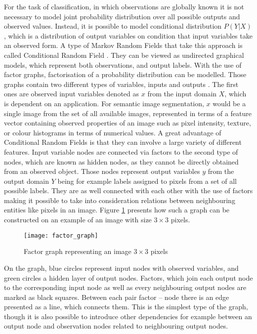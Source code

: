 For the task of classification, in which observations are globally known it is not necessary to model joint probability distribution over all possible outputs and observed values. Instead, it is possible to model conditional distribution $P(Y|X)$, which is a distribution of output variables on condition that input variables take an observed form.  A type of Markov Random Fields that take this approach is called Conditional Random Field \cite{crf_lafferty}. They can be viewed as undirected graphical models, which represent both observations, and output labels. With the use of factor graphs, factorisation of a probability distribution can be modelled. Those graphs contain two different types of variables, inputs and outputs \cite{crf_sutton}. The first ones are observed input variables denoted as $x$ from the input domain $X$, which is dependent on an application. For semantic image segmentation, $x$ would be a single image from the set of all available images, represented in terms of a feature vector containing observed properties of an image such as pixel intensity, texture, or colour histograms in terms of numerical values. A great advantage of Conditional Random Fields is that they can involve a large variety of different features. Input variable nodes are connected via factors to the second type of nodes, which are known as hidden nodes, as they cannot be directly obtained from an observed object. Those nodes represent output variables $y$ from the output domain $Y$ being for example labels assigned to pixels from a set of all possible labels. They are as well connected with each other with the use of factors making it possible to take into consideration relations between neighbouring entities like pixels in an image. Figure \ref{fig:factor_graph} presents how such a graph can be constructed on an example of an image with size $3\times3$ pixels.
\begin{figure}[ht]
    \centering
    \texttt{[image: factor\_graph]}
    \caption{Factor graph representing an image $3\times3$ pixels }
     \label{fig:factor_graph}
\end{figure}
On the graph, blue circles represent input nodes with observed variables, and green circles a hidden layer of output nodes. Factors, which join each output node to the corresponding input node as well as every neighbouring output nodes are marked as black squares. Between each pair factor – node there is an edge presented as a line, which connects them. This is the simplest type of the graph, though it is also possible to introduce other dependencies for example between an output node and observation nodes related to neighbouring output nodes. 
